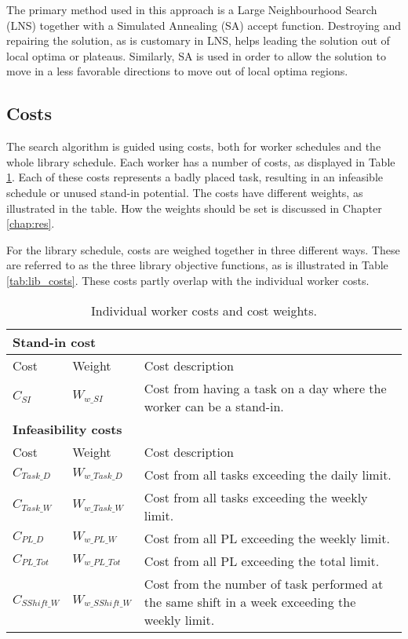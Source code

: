 The primary method used in this approach is a Large Neighbourhood Search (LNS) together with a Simulated Annealing (SA) accept function. Destroying and repairing the solution, as is customary in LNS, helps leading the solution out of local optima or plateaus. Similarly, SA is used in order to allow the solution to move in a less favorable directions to move out of local optima regions.

\subsection{Costs} \label{subsection:tasks_cost}
The search algorithm is guided using costs, both for worker schedules and the whole library schedule. Each worker has a number of costs, as displayed in Table \ref{tab:worker_costs}. Each of these costs represents a badly placed task, resulting in an infeasible schedule or unused stand-in potential. The costs have different weights, as illustrated in the table. How the weights should be set is discussed in Chapter \ref{chap:res}. 

For the library schedule, costs are weighed together in three different ways. These are referred to as the three library objective functions, as is illustrated in Table \ref{tab:lib_costs}. These costs partly overlap with the individual worker costs.

\begin{table}[!h]
\centering
\caption{Individual worker costs and cost weights.}
\label{tab:worker_costs}
\begin{tabular}{|l|l|p{7cm}|}
\hline
\multicolumn{3}{|l|}{\cellcolor{gray!90} \textbf{Stand-in cost}} \\ \hline
\rowcolor{Gray} Cost & Weight & Cost description \\ \hline
$C_{SI}$ & $W_{w\_SI}$ & Cost from having a task on a day where the worker can be a stand-in. \\ \hline
\multicolumn{3}{|l|}{\cellcolor{gray!90} \textbf{Infeasibility costs}} \\ \hline
\rowcolor{Gray} Cost & Weight & Cost description \\ \hline
$C_{Task\_D}$ & $W_{w\_Task\_D}$ & Cost from all tasks exceeding the daily limit. \\ \hline
$C_{Task\_W}$ & $W_{w\_Task\_W}$ & Cost from all tasks exceeding the weekly limit.  \\ \hline
$C_{PL\_D}$ & $W_{w\_PL\_W}$ & Cost from all PL exceeding the weekly limit. \\ \hline
$C_{PL\_Tot}$ & $W_{w\_PL\_Tot}$ & Cost from all PL exceeding the total limit. \\ \hline
$C_{SShift\_W}$ & $W_{w\_SShift\_W}$ & Cost from the number of task performed at the same shift in a week exceeding the weekly limit. \\ \hline
\end{tabular}
\end{table}

